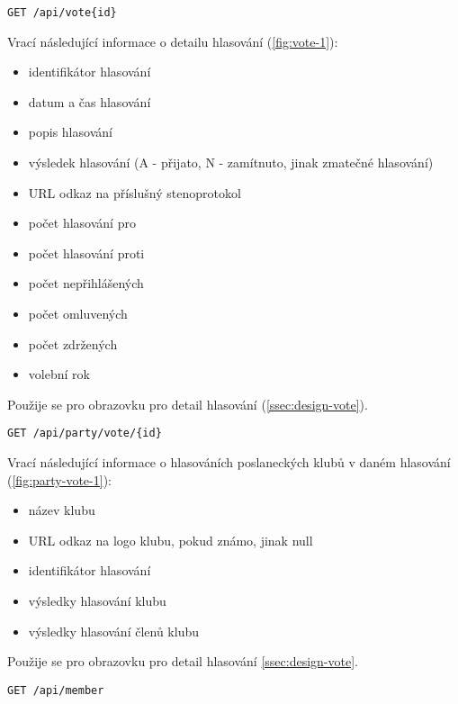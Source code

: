 \begin{lstlisting}[label={lst:endpoint-vote}] 
GET /api/vote{id}
\end{lstlisting}

\noindent Vrací následující informace o detailu hlasování (\ref{fig:vote-1}):
\begin{itemize}
	\item identifikátor hlasování
	\item datum a čas hlasování
	\item popis hlasování
	\item výsledek hlasování (A - přijato, N - zamítnuto, jinak zmatečné hlasování)
	\item URL odkaz na příslušný stenoprotokol
	\item počet hlasování pro
	\item počet hlasování proti
	\item počet nepřihlášených
	\item počet omluvených
	\item počet zdržených
	\item volební rok
\end{itemize}

\noindent Použije se pro obrazovku pro detail hlasování (\ref{ssec:design-vote}).

\vspace{10px}

\begin{lstlisting}[label={lst:endpoint-party-votes}] 
GET /api/party/vote/{id}
\end{lstlisting}

\noindent Vrací následující informace o hlasováních poslaneckých klubů v daném hlasování (\ref{fig:party-vote-1}):

\begin{itemize}
	\item název klubu
	\item URL odkaz na logo klubu, pokud známo, jinak null
	\item identifikátor hlasování
	\item výsledky hlasování klubu
	\item výsledky hlasování členů klubu
\end{itemize}

\noindent Použije se pro obrazovku pro detail hlasování \ref{ssec:design-vote}.

\vspace{10px}

\begin{lstlisting}[label={lst:endpoint-members}] 
GET /api/member
\end{lstlisting}

